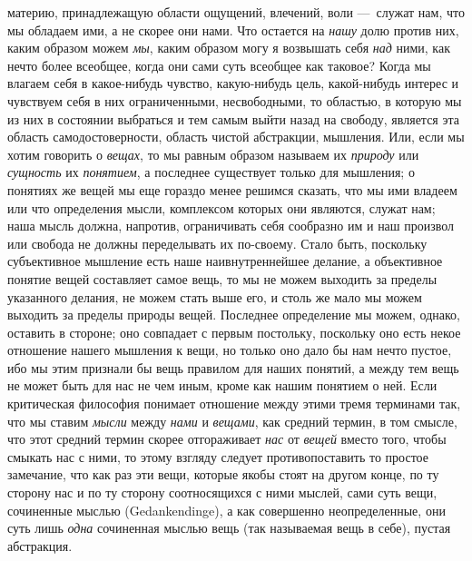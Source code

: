 материю, принадлежащую области ощущений, влечений, воли —~служат нам, что
мы обладаем ими, а не скорее они нами. Что остается на
{\em нашу} долю против них, каким образом можем
{\em мы}, каким образом могу я возвышать себя
{\em над} ними, как нечто более всеобщее, когда они
сами суть всеобщее как таковое? Когда мы влагаем себя в какое-нибудь
чувство, какую-нибудь цель, какой-нибудь интерес и чувствуем себя в них
ограниченными, несвободными, то областью, в которую мы из них в состоянии
выбраться и тем самым выйти назад на свободу, является эта область
самодостоверности, область чистой абстракции, мышления. Или, если мы хотим
говорить о {\em вещах}, то мы равным образом называем
их {\em природу} или {\em сущность}
их {\em понятием}, а последнее существует только для
мышления; о понятиях же вещей мы еще гораздо менее решимся сказать, что мы
ими владеем или что определения мысли, комплексом которых они являются,
служат нам; наша мысль должна, напротив, ограничивать себя сообразно им и
наш произвол или свобода не должны переделывать их по-своему. Стало быть,
поскольку субъективное мышление есть наше наивнутреннейшее делание, а
объективное понятие вещей составляет самое вещь, то мы не можем выходить за
пределы указанного делания, не можем стать выше его, и столь же мало мы
можем выходить за пределы природы вещей. Последнее определение мы можем,
однако, оставить в стороне; оно совпадает с первым постольку, поскольку оно
есть некое отношение нашего мышления к вещи, но только оно дало бы нам
нечто пустое, ибо мы этим признали бы вещь правилом для наших понятий, а
между тем вещь не может быть для нас не чем иным, кроме как нашим понятием
о ней. Если критическая философия понимает отношение между этими тремя
терминами так, что мы ставим {\em мысли} между
{\em нами} и {\em вещами}, как
средний термин, в том смысле, что этот средний термин скорее отгораживает
{\em нас} от {\em вещей} вместо
того, чтобы смыкать нас с ними, то этому взгляду следует противопоставить
то простое замечание, что как раз эти вещи, которые якобы стоят на другом
конце, по ту сторону нас и по ту сторону соотносящихся с ними мыслей, сами
суть вещи, сочиненные мыслью (Gedankendinge), а как совершенно
неопределенные, они суть лишь {\em одна} сочиненная
мыслью вещь (так называемая вещь в себе), пустая абстракция.

